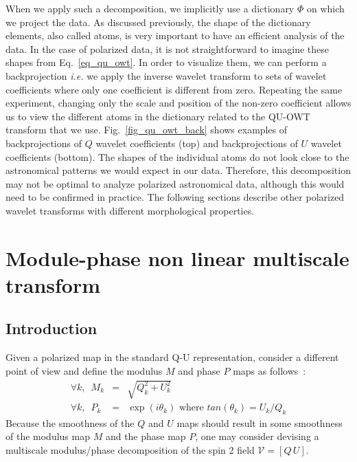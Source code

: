 When we apply such a decomposition, we implicitly use a  dictionary $\Phi$ on which we project the data.
As discussed previously, the shape of the dictionary elements, also called atoms, is very important to have 
an efficient analysis of the data. In the case of polarized data, it is not straightforward to imagine these 
shapes from Eq.~\eqref{eq_qu_owt}. In order to visualize them, we can perform a backprojection \textit{i.e.}
we apply the inverse wavelet transform to sets of wavelet coefficients where only one coefficient is different from zero. 
Repeating the same experiment, changing only the scale and position of the non-zero coefficient allows us 
to view the different atoms in the dictionary related to the  QU-OWT transform that we use. Fig.~\ref{fig_qu_owt_back} shows 
examples of backprojections of $Q$ wavelet coefficients (top) and backprojections of $U$ wavelet coefficients (bottom).
The shapes of the individual atoms do not look close to the astronomical patterns we would expect in our data. 
Therefore, this decomposition may not be optimal to analyze polarized astronomical data, although this would need 
to be confirmed in practice. The following sections describe other polarized wavelet transforms with different morphological properties.


\section{Module-phase non linear multiscale transform}
\label{sec:modphase}

\subsection{Introduction}
Given a polarized map in the standard Q-U representation, consider a different point of view and define the modulus $M$ and phase $P$ maps as follows~:
%
\begin{eqnarray}
\forall k,\,\,\, M_k & = & \sqrt{Q_k^2 +  U_k^2} \\
\forall k,\,\,\, P_k & = & \exp(i \theta_k) \mbox{ where } tan(\theta_k) = U_k/Q_k 
\end{eqnarray}
Because the smoothness of the $Q$ and $U$ maps should result in some smoothness of the modulus map $M$ and the phase map $P$, 
one may consider devising a multiscale modulus/phase decomposition of the spin 2 field ${\mathcal{V}} = \left[ Q \, U\right]$.\\

